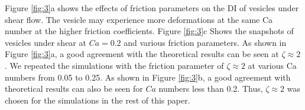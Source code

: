 Figure \ref{fig:3}a shows the effects of friction parameters on the DI of vesicles under shear flow. The vesicle may experience more deformations at the same Ca number at the higher friction coefficients. Figure \ref{fig:3}c Shows the snapshots of vesicles under shear at $Ca=0.2$ and various friction parameters. As shown in Figure \ref{fig:3}a, a good agreement with the theoretical results can be seen at $\zeta\approx2$. We repeated the simulations with the friction parameter of $\zeta\approx2$ at various Ca numbers from 0.05 to 0.25. As shown in Figure \ref{fig:3}b, a good agreement with theoretical results can also be seen for $Ca$ numbers less than 0.2. Thus, $\zeta\approx2$ was chosen for the simulations in the rest of this paper.